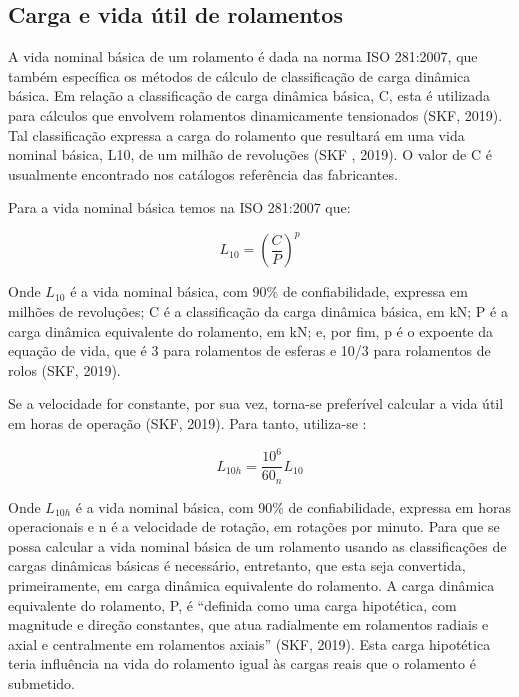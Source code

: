 \documentclass[
	12pt,				
	oneside,			
	a4paper,			
	english,			
	brazil,			
	]{abntex2ppgsi}
\begin{document}
\subsection{\textbf{Carga e vida útil de rolamentos}}

A vida nominal básica de um rolamento é dada na norma ISO 281:2007, que também específica os métodos de cálculo de classificação de carga dinâmica básica. Em relação a classificação de carga dinâmica básica, C, esta é utilizada para cálculos que envolvem rolamentos dinamicamente tensionados (SKF, 2019). Tal classificação expressa a carga do rolamento que resultará em uma vida nominal básica, L10, de um milhão de revoluções (SKF , 2019). O valor de C é usualmente encontrado nos catálogos referência das fabricantes.   

Para a vida nominal básica temos na ISO 281:2007 que:

\begin{equation}
	L_{10}= \left ( \frac{C}{P} \right )^{p}
	\label{eq: Vida Nominal Básica}
\end{equation}


Onde $L_{10}$ é a vida nominal básica, com 90\% de confiabilidade, expressa em milhões de revoluções; C é a classificação da carga dinâmica básica, em kN; P é a carga dinâmica equivalente do rolamento, em kN; e, por fim, p é o expoente da equação de vida, que é 3 para rolamentos de esferas e 10/3 para rolamentos de rolos (SKF, 2019).

Se a velocidade for constante, por sua vez, torna-se preferível calcular a vida útil em horas de operação (SKF, 2019). Para tanto, utiliza-se :

\begin{equation}
	L_{10h}= \frac{10^{6}}{60_{n}}L_{10}
	\label{eq: Vida Útil em Horas}
\end{equation}


Onde $L_{10h}$ é a vida nominal básica, com 90\% de confiabilidade, expressa em horas operacionais e n é a velocidade de rotação, em rotações por minuto. 
Para que se possa calcular a vida nominal básica de um rolamento usando as classificações de cargas dinâmicas básicas é necessário, entretanto, que esta seja convertida, primeiramente, em carga dinâmica equivalente do rolamento. A carga dinâmica equivalente do rolamento, P, é “definida como uma carga hipotética, com magnitude e direção constantes, que atua radialmente em rolamentos radiais e axial e centralmente em rolamentos axiais” (SKF, 2019). Esta carga hipotética teria influência na vida do rolamento igual às cargas reais que o rolamento é submetido.
\end{document}
